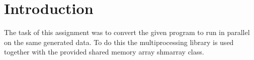 \documentclass{Article}
\begin{document}

\clearpage\maketitle
\thispagestyle{empty}




%

\section{Introduction}
The task of this assignment was to convert the given program to run in parallel on the same generated data. To do this the multiprocessing library is used together with the provided shared memory array shmarray class.
\end{document}
